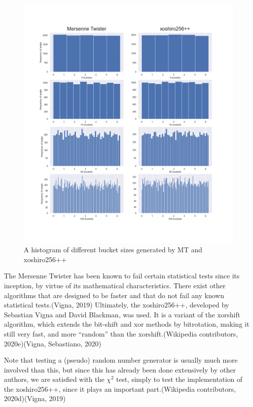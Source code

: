 \documentclass[
]{article}
\begin{document}
\begin{figure}
\centering
\includegraphics{Assets/angle_buckets.png}
\caption{A histogram of different bucket sizes generated by MT and
xoshiro256++}
\end{figure}

The Mersenne Twister has been known to fail certain statistical tests
since its inception, by virtue of its mathematical characteristics.
There exist other algorithms that are designed to be faster and that do
not fail any known statistical tests.(Vigna, 2019) Ultimately, the
xoshiro256++, developed by Sebastian Vigna and David Blackman, was used.
It is a variant of the xorshift algorithm, which extends the bit-shift
and xor methods by bitrotation, making it still very fast, and more
``random'' than the xorshift.(Wikipedia contributors, 2020e)(Vigna,
Sebastiano, 2020)

Note that testing a (pseudo) random number generator is usually much
more involved than this, but since this has already been done
extensively by other authors, we are satisfied with the \(\chi^2\) test,
simply to test the implementation of the xoshiro256++, since it plays an
important part.(Wikipedia contributors, 2020d)(Vigna, 2019)
\end{document}
